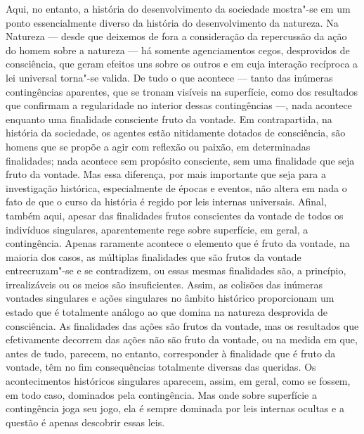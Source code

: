 Aqui, no entanto, a história do desenvolvimento da sociedade mostra"-se
em um ponto essencialmente diverso da história do desenvolvimento da
natureza. Na Natureza --- desde que deixemos de fora a consideração da
repercussão da ação do homem sobre a natureza --- há 
somente agenciamentos cegos, desprovidos de consciência, que geram
efeitos uns sobre os outros e em cuja interação recíproca a lei
universal torna"-se valida. De tudo o que acontece --- tanto das inúmeras
contingências aparentes, que se tronam visíveis na superfície, como dos
resultados que confirmam a regularidade no 
interior dessas contingências ---, nada acontece enquanto uma finalidade
consciente fruto da vontade. Em contrapartida, na história da sociedade,
os agentes estão nitidamente dotados de consciência, são homens que se
propõe a agir com reflexão ou paixão, em determinadas finalidades; nada
acontece sem propósito consciente, sem uma finalidade que seja fruto da
vontade. Mas essa diferença, por mais importante que seja para a
investigação histórica, especialmente de épocas e eventos, não altera em
nada o fato de que o curso da história é regido por leis internas
universais. Afinal, também aqui, apesar das finalidades frutos
conscientes da vontade de todos os indivíduos singulares, aparentemente
rege sobre superfície, em geral, a contingência. Apenas raramente
acontece o elemento que é fruto da vontade, na maioria dos casos, as
múltiplas finalidades que são frutos da vontade entrecruzam"-se e se
contradizem, ou essas mesmas finalidades são, a princípio, irrealizáveis
ou os meios são insuficientes. Assim, as colisões das inúmeras vontades
singulares e ações singulares no âmbito histórico proporcionam um estado
que é totalmente análogo ao que domina na natureza desprovida de
consciência. As finalidades das ações são frutos da vontade, mas os
resultados que efetivamente decorrem das ações não são fruto da vontade,
ou na medida em que, antes de tudo, parecem, no entanto, corresponder à
finalidade que é fruto da vontade, têm no fim consequências totalmente
diversas das queridas. Os acontecimentos históricos singulares aparecem,
assim, em geral, como se fossem, em todo caso, dominados pela
contingência. Mas onde sobre superfície a contingência joga seu jogo,
ela é sempre dominada por leis internas ocultas e a questão é apenas
descobrir essas leis.

